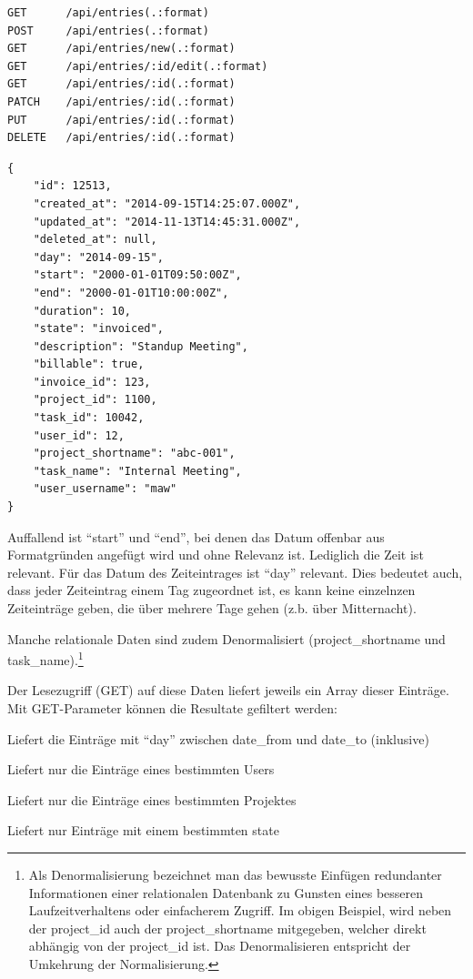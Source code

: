 \documentclass[]{article}
\begin{document}
\begin{lstlisting}[caption=Controllr REST API für Zeiteinträge, label=lstcontrollrentries]
GET      /api/entries(.:format)                          
POST     /api/entries(.:format)                          
GET      /api/entries/new(.:format)                      
GET      /api/entries/:id/edit(.:format)                 
GET      /api/entries/:id(.:format)                      
PATCH    /api/entries/:id(.:format)                      
PUT      /api/entries/:id(.:format)                      
DELETE   /api/entries/:id(.:format)
\end{lstlisting}

\begin{lstlisting}[caption=Schema von /api/entries, label=lstcontrollrentriesresult]
{
    "id": 12513,
    "created_at": "2014-09-15T14:25:07.000Z",
    "updated_at": "2014-11-13T14:45:31.000Z",
    "deleted_at": null,
    "day": "2014-09-15",
    "start": "2000-01-01T09:50:00Z",
    "end": "2000-01-01T10:00:00Z",
    "duration": 10,
    "state": "invoiced",
    "description": "Standup Meeting",
    "billable": true,
    "invoice_id": 123,
    "project_id": 1100,
    "task_id": 10042,
    "user_id": 12,
    "project_shortname": "abc-001",
    "task_name": "Internal Meeting",
    "user_username": "maw"
}
\end{lstlisting}

Auffallend ist ``start'' und ``end'', bei denen das Datum offenbar aus
Formatgründen angefügt wird und ohne Relevanz ist. Lediglich die Zeit
ist relevant. Für das Datum des Zeiteintrages ist ``day'' relevant. Dies
bedeutet auch, dass jeder Zeiteintrag einem Tag zugeordnet ist, es kann
keine einzelnzen Zeiteinträge geben, die über mehrere Tage gehen (z.b.
über Mitternacht).

Manche relationale Daten sind zudem Denormalisiert (project\_shortname
und task\_name).\footnote{Als Denormalisierung bezeichnet man das
  bewusste Einfügen redundanter Informationen einer relationalen
  Datenbank zu Gunsten eines besseren Laufzeitverhaltens oder
  einfacherem Zugriff. Im obigen Beispiel, wird neben der project\_id
  auch der project\_shortname mitgegeben, welcher direkt abhängig von
  der project\_id ist. Das Denormalisieren entspricht der Umkehrung der
  Normalisierung.}

Der Lesezugriff (GET) auf diese Daten liefert jeweils ein Array dieser
Einträge. Mit GET-Parameter können die Resultate gefiltert werden:

\begin{description}
\itemsep1pt\parskip0pt
\item[date\_to, date\_from]
Liefert die Einträge mit ``day'' zwischen date\_from und date\_to
(inklusive)
\item[employee\_usernames]
Liefert nur die Einträge eines bestimmten Users
\item[project\_shortnames]
Liefert nur die Einträge eines bestimmten Projektes
\item[states]
Liefert nur Einträge mit einem bestimmten state
\end{description}
\end{document}
